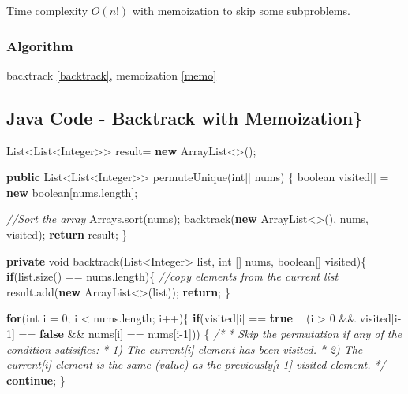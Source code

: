 \documentclass[]{book}
\newenvironment{Shaded}{\begin{snugshade}}{\end{snugshade}}
\newcommand{\BuiltInTok}[1]{#1}
\newcommand{\CommentTok}[1]{\textcolor[rgb]{0.56,0.35,0.01}{\textit{#1}}}
\newcommand{\DataTypeTok}[1]{\textcolor[rgb]{0.13,0.29,0.53}{#1}}
\newcommand{\DecValTok}[1]{\textcolor[rgb]{0.00,0.00,0.81}{#1}}
\newcommand{\FunctionTok}[1]{\textcolor[rgb]{0.00,0.00,0.00}{#1}}
\newcommand{\KeywordTok}[1]{\textcolor[rgb]{0.13,0.29,0.53}{\textbf{#1}}}
\newcommand{\NormalTok}[1]{#1}
\begin{document}
Time complexity \(O(n!)\) with memoization to skip some subproblems.

\hypertarget{algorithm-16}{%
\subsubsection{Algorithm}\label{algorithm-16}}

backtrack \ref{backtrack}, memoization \ref{memo}

\hypertarget{java-code---backtrack-with-memoization-1}{%
\subsection{Java Code - Backtrack with Memoization\}}\label{java-code---backtrack-with-memoization-1}}

\begin{Shaded}
\begin{Highlighting}[]
\BuiltInTok{List}\NormalTok{<}\BuiltInTok{List}\NormalTok{<}\BuiltInTok{Integer}\NormalTok{>> result= }\KeywordTok{new} \BuiltInTok{ArrayList}\NormalTok{<>();}

\KeywordTok{public} \BuiltInTok{List}\NormalTok{<}\BuiltInTok{List}\NormalTok{<}\BuiltInTok{Integer}\NormalTok{>> }\FunctionTok{permuteUnique}\NormalTok{(}\DataTypeTok{int}\NormalTok{[] nums) \{}
    \DataTypeTok{boolean}\NormalTok{ visited[] = }\KeywordTok{new} \DataTypeTok{boolean}\NormalTok{[nums.}\FunctionTok{length}\NormalTok{];}

    \CommentTok{//Sort the array}
    \BuiltInTok{Arrays}\NormalTok{.}\FunctionTok{sort}\NormalTok{(nums);}
    \FunctionTok{backtrack}\NormalTok{(}\KeywordTok{new} \BuiltInTok{ArrayList}\NormalTok{<>(), nums, visited);}
    \KeywordTok{return}\NormalTok{ result;}
\NormalTok{\}}

\KeywordTok{private} \DataTypeTok{void} \FunctionTok{backtrack}\NormalTok{(}\BuiltInTok{List}\NormalTok{<}\BuiltInTok{Integer}\NormalTok{> list, }\DataTypeTok{int}\NormalTok{ [] nums, }\DataTypeTok{boolean}\NormalTok{[] visited)\{}
    \KeywordTok{if}\NormalTok{(list.}\FunctionTok{size}\NormalTok{() == nums.}\FunctionTok{length}\NormalTok{)\{}
        \CommentTok{//copy elements from the current list}
\NormalTok{        result.}\FunctionTok{add}\NormalTok{(}\KeywordTok{new} \BuiltInTok{ArrayList}\NormalTok{<>(list));}
        \KeywordTok{return}\NormalTok{;}
\NormalTok{    \}}

    \KeywordTok{for}\NormalTok{(}\DataTypeTok{int}\NormalTok{ i = }\DecValTok{0}\NormalTok{; i < nums.}\FunctionTok{length}\NormalTok{; i++)\{}
        \KeywordTok{if}\NormalTok{(visited[i] == }\KeywordTok{true}\NormalTok{ || (i > }\DecValTok{0}\NormalTok{ && visited[i}\DecValTok{-1}\NormalTok{] == }\KeywordTok{false}\NormalTok{ && nums[i] == nums[i}\DecValTok{-1}\NormalTok{])) \{}
            \CommentTok{/*}
\CommentTok{            * Skip the permutation if any of the condition satisifies:}
\CommentTok{            * 1) The current[i] element has been visited.}
\CommentTok{            * 2) The current[i] element is the same (value) as the previously[i-1] visited element.}
\CommentTok{            */}
            \KeywordTok{continue}\NormalTok{;}
\NormalTok{        \}}


\end{Highlighting}
\end{Shaded}
\end{document}
